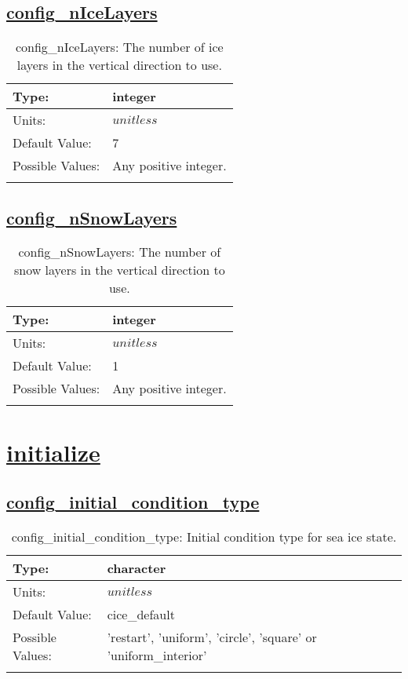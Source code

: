 \subsection[config\_nIceLayers]{\hyperref[sec:nm_tab_dimensions]{config\_nIceLayers}}
\label{subsec:nm_sec_config_nIceLayers}
\begin{center}
\begin{longtable}{| p{2.0in} || p{4.0in} |}
    \hline
    Type: & integer \\
    \hline
    Units: & $unitless$ \\
    \hline
    Default Value: & 7 \\
    \hline
    Possible Values: & Any positive integer. \\
    \hline
    \caption{config\_nIceLayers: The number of ice layers in the vertical direction to use.}
\end{longtable}
\end{center}
\subsection[config\_nSnowLayers]{\hyperref[sec:nm_tab_dimensions]{config\_nSnowLayers}}
\label{subsec:nm_sec_config_nSnowLayers}
\begin{center}
\begin{longtable}{| p{2.0in} || p{4.0in} |}
    \hline
    Type: & integer \\
    \hline
    Units: & $unitless$ \\
    \hline
    Default Value: & 1 \\
    \hline
    Possible Values: & Any positive integer. \\
    \hline
    \caption{config\_nSnowLayers: The number of snow layers in the vertical direction to use.}
\end{longtable}
\end{center}
\section[initialize]{\hyperref[sec:nm_tab_initialize]{initialize}}
\label{sec:nm_sec_initialize}
\subsection[config\_initial\_condition\_type]{\hyperref[sec:nm_tab_initialize]{config\_initial\_condition\_type}}
\label{subsec:nm_sec_config_initial_condition_type}
\begin{center}
\begin{longtable}{| p{2.0in} || p{4.0in} |}
    \hline
    Type: & character \\
    \hline
    Units: & $unitless$ \\
    \hline
    Default Value: & cice\_default \\
    \hline
    Possible Values: & 'restart', 'uniform', 'circle', 'square' or 'uniform\_interior' \\
    \hline
    \caption{config\_initial\_condition\_type: Initial condition type for sea ice state.}
\end{longtable}
\end{center}
